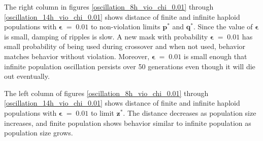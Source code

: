 The right column in figures \ref{oscillation_8h_vio_chi_0.01} through \ref{oscillation_14h_vio_chi_0.01} 
shows distance of finite and infinite haploid populations with $\bm{\epsilon} \;=\; 0.01$ to non-violation limits $\bm{p^\ast}$ and $\bm{q^\ast}$. 
Since the value of $\bm{\epsilon}$ is small, damping of ripples is slow. 
A new mask with probability $\bm{\epsilon} \;=\; 0.01$ has small 
probability of being used during crossover and when not used, 
behavior matches behavior without violation. 
Moreover, $\bm{\epsilon} \;=\; 0.01$ is small enough that 
infinite population oscillation persists over 50 generations even though it will die out eventually. 

The left column of figures \ref{oscillation_8h_vio_chi_0.01} through \ref{oscillation_14h_vio_chi_0.01} 
shows distance of finite and infinite haploid populations with $\bm{\epsilon} \;=\; 0.01$ to limit $\bm{z^\ast}$. 
The distance decreases as population size increases, 
and finite population shows behavior similar to infinite population as population size grows. 

